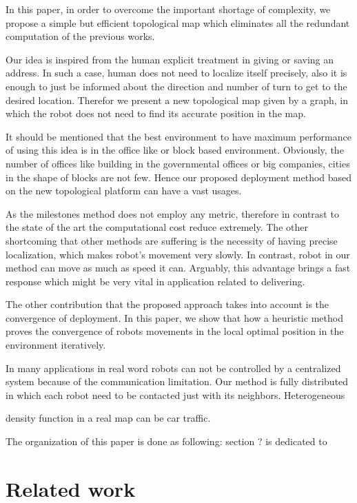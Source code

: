 \documentclass[letterpaper, 10 pt, conference]{ieeeconf}  %
\begin{document}
In this paper, in order to overcome the important shortage of complexity, we propose a simple but efficient topological map which eliminates all the redundant computation of the previous works. 
%

Our idea is inspired from the human explicit treatment in giving or saving an address. In such a case, human does not need to localize itself precisely, also it is enough to just be informed about the direction and number of turn to get to the desired location. Therefor we present a new topological map given by a graph, in which the robot does not need to find its accurate position in the map. 
%

It should be mentioned that the best environment to have maximum performance of using this idea is in the office like or block based environment. Obviously, the number of offices like building in the governmental offices or big companies, cities in the shape of blocks are not few. Hence our proposed deployment method based on the new topological platform can have a vast usages.

As the milestones method does not employ any metric, therefore in contrast to the state of the art the computational cost reduce extremely. The other shortcoming that other methods are suffering is the necessity of having precise localization, which makes robot's movement very slowly. In contrast, robot in our method can move as much as speed it can. Arguably, this advantage brings a fast response which might be very vital in application related to delivering. 

The other contribution that the proposed approach takes into account is the convergence of deployment. In this paper, we show that how a heuristic method proves the convergence of robots movements in the local optimal position in the environment iteratively.

In many applications in real word robots can not be controlled by a centralized system because of the communication limitation. Our method is fully distributed in which each robot need to be contacted just with its neighbors. 
% 
Heterogeneous 
%

{\color{red} density function in a real map can be car traffic.}

%
The organization of this paper is done as following:
section ? is dedicated to 
%
\section{Related work}
\end{document}
